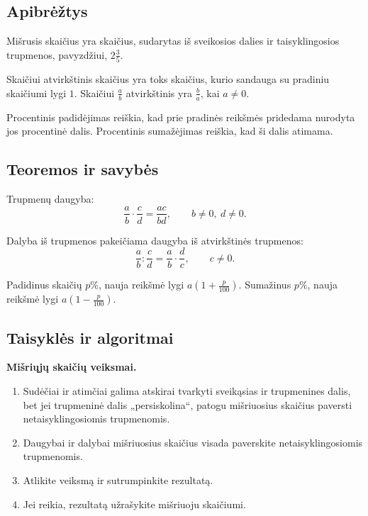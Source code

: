 \subsection{Apibrėžtys}
\begin{apibreztis}
Mišrusis skaičius yra skaičius, sudarytas iš sveikosios dalies ir taisyklingosios trupmenos, pavyzdžiui, \(2\frac{3}{5}\).
\end{apibreztis}
\begin{apibreztis}
Skaičiui atvirkštinis skaičius yra toks skaičius, kurio sandauga su pradiniu skaičiumi lygi \(1\). Skaičiui \(\frac{a}{b}\) atvirkštinis yra \(\frac{b}{a}\), kai \(a\ne 0\).
\end{apibreztis}
\begin{apibreztis}
Procentinis padidėjimas reiškia, kad prie pradinės reikšmės pridedama nurodyta jos procentinė dalis. Procentinis sumažėjimas reiškia, kad ši dalis atimama.
\end{apibreztis}

\subsection{Teoremos ir savybės}
\begin{savybe}
Trupmenų daugyba:
\[
\frac{a}{b}\cdot \frac{c}{d}=\frac{ac}{bd},\qquad b\ne 0,\ d\ne 0.
\]
\end{savybe}
\begin{savybe}
Dalyba iš trupmenos pakeičiama daugyba iš atvirkštinės trupmenos:
\[
\frac{a}{b}:\frac{c}{d}=\frac{a}{b}\cdot \frac{d}{c},\qquad c\ne 0.
\]
\end{savybe}
\begin{savybe}
Padidinus skaičių \(p\%\), nauja reikšmė lygi \(a(1+\frac{p}{100})\). Sumažinus \(p\%\), nauja reikšmė lygi \(a(1-\frac{p}{100})\).
\end{savybe}

\subsection{Taisyklės ir algoritmai}
\textbf{Mišriųjų skaičių veiksmai.}
\begin{enumerate}[label=\arabic*.]
\item Sudėčiai ir atimčiai galima atskirai tvarkyti sveikąsias ir trupmenines dalis, bet jei trupmeninė dalis „persiskolina“, patogu mišriuosius skaičius paversti netaisyklingosiomis trupmenomis.
\item Daugybai ir dalybai mišriuosius skaičius visada paverskite netaisyklingosiomis trupmenomis.
\item Atlikite veiksmą ir sutrumpinkite rezultatą.
\item Jei reikia, rezultatą užrašykite mišriuoju skaičiumi.
\end{enumerate}

